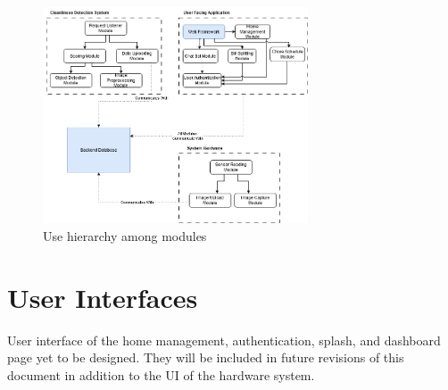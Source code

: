 \documentclass[12pt, titlepage]{article}
\begin{document}
\begin{figure}[H]
\centering
\includegraphics[width=0.7\textwidth]{UsesHierarchy.png}
\caption{Use hierarchy among modules}
\label{FigUH}
\end{figure}




\section{User Interfaces}
User interface of the home management, authentication, splash, and dashboard page yet to be designed. They will be included in future revisions of this document in addition to the UI of the hardware system.
\end{document}
